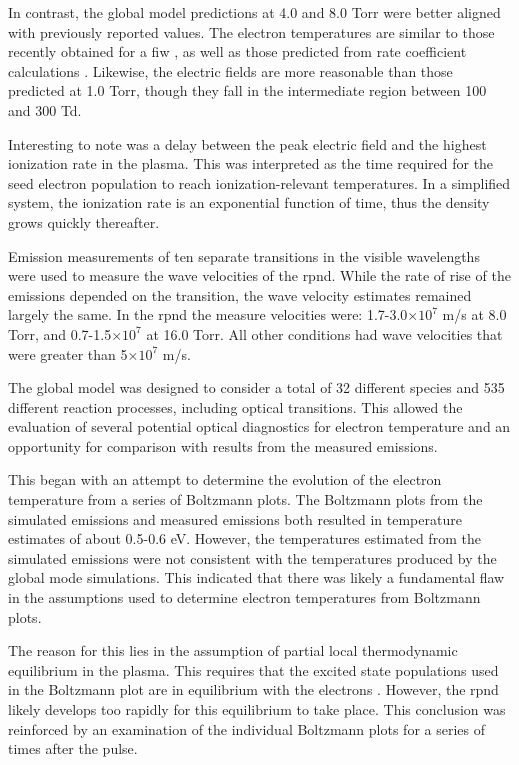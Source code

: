 In contrast, the global model predictions at 4.0 and 8.0 Torr were better
aligned with previously reported values. The electron temperatures are similar
to those recently obtained for a \acs{fiw} \cite{Takashima2011}, as well as
those predicted from rate coefficient calculations \cite{Aleksandrov2007}.
Likewise, the electric fields are more reasonable than those predicted at 1.0
Torr, though they fall in the intermediate region between 100 and 300 Td.

Interesting to note was a delay between the peak electric field and the highest
ionization rate in the plasma. This was interpreted as the time required for the
seed electron population to reach ionization-relevant temperatures. In a
simplified system, the ionization rate is an exponential function of time,
thus the density grows quickly thereafter.

Emission measurements of ten separate transitions in the visible wavelengths
were used to measure the wave velocities of the \acs{rpnd}. While the rate of
rise of the emissions depended on the transition, the wave velocity estimates
remained largely the same. In the \acs{rpnd} the measure velocities were:
1.7-3.0$\times10^7$ m/s at 8.0 Torr, and 0.7-1.5$\times10^7$ at 16.0 Torr. All
other conditions had wave velocities that were greater than 5$\times10^7$ m/s.

The global model was designed to consider a total of 32 different species and
535 different reaction processes, including optical transitions. This allowed
the evaluation of several potential optical diagnostics for electron temperature
and an opportunity for comparison with results from the measured emissions.

This began with an attempt to determine the evolution of the electron
temperature from a series of Boltzmann plots. The Boltzmann plots from the
simulated emissions and measured emissions both resulted in temperature
estimates of about 0.5-0.6 eV. However, the temperatures estimated from the
simulated emissions were not consistent with the temperatures produced by the
global mode simulations. This indicated that there was likely a fundamental flaw
in the assumptions used to determine electron temperatures from Boltzmann plots.

The reason for this lies in the assumption of partial local thermodynamic
equilibrium in the plasma. This requires that the excited state populations used
in the Boltzmann plot are in equilibrium with the electrons \cite{Kunze2009}.
However, the \acs{rpnd} likely develops too rapidly for this equilibrium to take
place. This conclusion was reinforced by an examination of the individual
Boltzmann plots for a series of times after the pulse.

